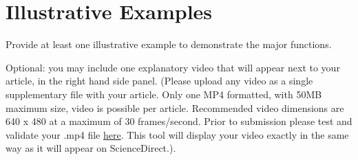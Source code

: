 \section{Illustrative Examples}
\label{} 

Provide at least one illustrative example to demonstrate the major functions.


Optional: you may include one explanatory video that will appear next to your article, in the right hand side panel. (Please upload any video as a single supplementary file with your article. Only one MP4 formatted, with 50MB maximum size, video is possible per article. Recommended video dimensions are 640 x 480 at a maximum of 30 frames/second. Prior to submission please test and validate your .mp4 file \href{http://elsevier-apps.sciverse.com/GadgetVideoPodcastPlayerWeb/verification}{here}. This tool will display your video exactly in the same way as it will appear on ScienceDirect.).

  
  